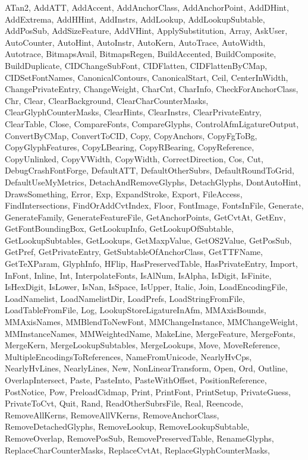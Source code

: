 \documentclass[11pt]{report}
\begin{document}
ATan2,
AddATT,
AddAccent,
AddAnchorClass,
AddAnchorPoint,
AddDHint,
AddExtrema,
AddHHint,
AddInstrs,
AddLookup,
AddLookupSubtable,
AddPosSub,
AddSizeFeature,
AddVHint,
ApplySubstitution,
Array,
AskUser,
AutoCounter,
AutoHint,
AutoInstr,
AutoKern,
AutoTrace,
AutoWidth,
Autotrace,
BitmapsAvail,
BitmapsRegen,
BuildAccented,
BuildComposite,
BuildDuplicate,
CIDChangeSubFont,
CIDFlatten,
CIDFlattenByCMap,
CIDSetFontNames,
CanonicalContours,
CanonicalStart,
Ceil,
CenterInWidth,
ChangePrivateEntry,
ChangeWeight,
CharCnt,
CharInfo,
CheckForAnchorClass,
Chr,
Clear,
ClearBackground,
ClearCharCounterMasks,
ClearGlyphCounterMasks,
ClearHints,
ClearInstrs,
ClearPrivateEntry,
ClearTable,
Close,
CompareFonts,
CompareGlyphs,
ControlAfmLigatureOutput,
ConvertByCMap,
ConvertToCID,
Copy,
CopyAnchors,
CopyFgToBg,
CopyGlyphFeatures,
CopyLBearing,
CopyRBearing,
CopyReference,
CopyUnlinked,
CopyVWidth,
CopyWidth,
CorrectDirection,
Cos,
Cut,
DebugCrashFontForge,
DefaultATT,
DefaultOtherSubrs,
DefaultRoundToGrid,
DefaultUseMyMetrics,
DetachAndRemoveGlyphs,
DetachGlyphs,
DontAutoHint,
DrawsSomething,
Error,
Exp,
ExpandStroke,
Export,
FileAccess,
FindIntersections,
FindOrAddCvtIndex,
Floor,
FontImage,
FontsInFile,
Generate,
GenerateFamily,
GenerateFeatureFile,
GetAnchorPoints,
GetCvtAt,
GetEnv,
GetFontBoundingBox,
GetLookupInfo,
GetLookupOfSubtable,
GetLookupSubtables,
GetLookups,
GetMaxpValue,
GetOS2Value,
GetPosSub,
GetPref,
GetPrivateEntry,
GetSubtableOfAnchorClass,
GetTTFName,
GetTeXParam,
GlyphInfo,
HFlip,
HasPreservedTable,
HasPrivateEntry,
Import,
InFont,
Inline,
Int,
InterpolateFonts,
IsAlNum,
IsAlpha,
IsDigit,
IsFinite,
IsHexDigit,
IsLower,
IsNan,
IsSpace,
IsUpper,
Italic,
Join,
LoadEncodingFile,
LoadNamelist,
LoadNamelistDir,
LoadPrefs,
LoadStringFromFile,
LoadTableFromFile,
Log,
LookupStoreLigatureInAfm,
MMAxisBounds,
MMAxisNames,
MMBlendToNewFont,
MMChangeInstance,
MMChangeWeight,
MMInstanceNames,
MMWeightedName,
MakeLine,
MergeFeature,
MergeFonts,
MergeKern,
MergeLookupSubtables,
MergeLookups,
Move,
MoveReference,
MultipleEncodingsToReferences,
NameFromUnicode,
NearlyHvCps,
NearlyHvLines,
NearlyLines,
New,
NonLinearTransform,
Open,
Ord,
Outline,
OverlapIntersect,
Paste,
PasteInto,
PasteWithOffset,
PositionReference,
PostNotice,
Pow,
PreloadCidmap,
Print,
PrintFont,
PrintSetup,
PrivateGuess,
PrivateToCvt,
Quit,
Rand,
ReadOtherSubrsFile,
Real,
Reencode,
RemoveAllKerns,
RemoveAllVKerns,
RemoveAnchorClass,
RemoveDetachedGlyphs,
RemoveLookup,
RemoveLookupSubtable,
RemoveOverlap,
RemovePosSub,
RemovePreservedTable,
RenameGlyphs,
ReplaceCharCounterMasks,
ReplaceCvtAt,
ReplaceGlyphCounterMasks,
\end{document}
